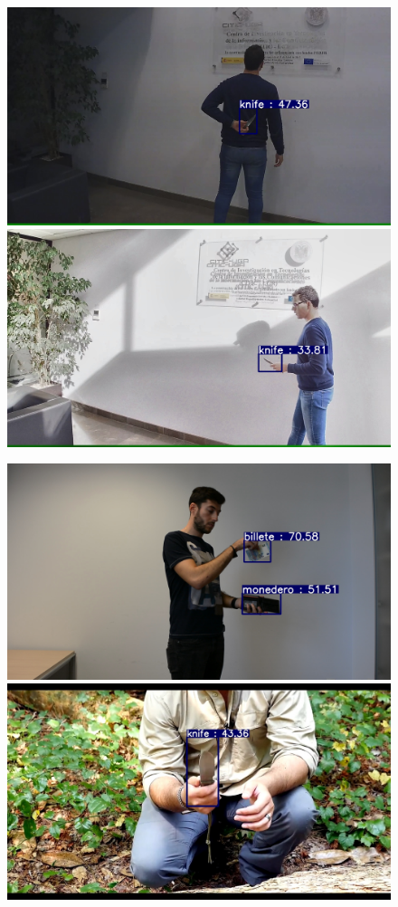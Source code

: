 \documentclass[a4paper]{article}
\begin{document}
\begin{figure}[h]
	\center
	\begin{multicols}{2}
		\includegraphics[width=1.\linewidth]{fig/SOHAS_9}
		\includegraphics[width=1.\linewidth]{fig/SOHAS_104}
	\end{multicols}
	\begin{multicols}{2}
		\includegraphics[width=1.\linewidth]{fig/SOHAS_133}
		\includegraphics[width=1.\linewidth]{fig/SOHAS_257}

\end{multicols}
\end{figure}
\end{document}
